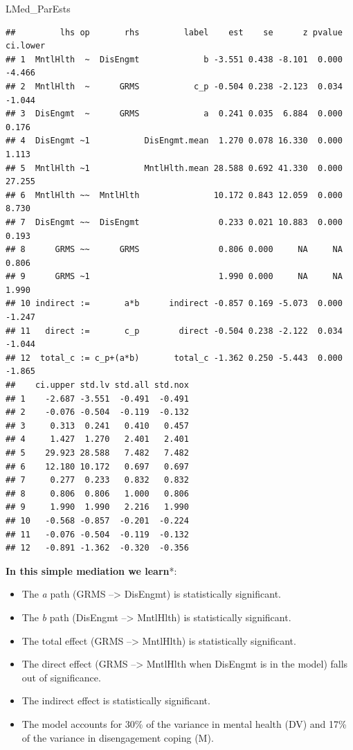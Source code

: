 \documentclass[
  11pt,
]{book}
\newenvironment{Shaded}{\begin{snugshade}}{\end{snugshade}}
\newcommand{\NormalTok}[1]{#1}
\providecommand{\tightlist}{%
  \setlength{\itemsep}{0pt}\setlength{\parskip}{0pt}}
\begin{document}
\begin{Shaded}
\begin{Highlighting}[]
\NormalTok{LMed\_ParEsts}
\end{Highlighting}
\end{Shaded}

\begin{verbatim}
##         lhs op       rhs         label    est    se      z pvalue ci.lower
## 1  MntlHlth  ~  DisEngmt             b -3.551 0.438 -8.101  0.000   -4.466
## 2  MntlHlth  ~      GRMS           c_p -0.504 0.238 -2.123  0.034   -1.044
## 3  DisEngmt  ~      GRMS             a  0.241 0.035  6.884  0.000    0.176
## 4  DisEngmt ~1           DisEngmt.mean  1.270 0.078 16.330  0.000    1.113
## 5  MntlHlth ~1           MntlHlth.mean 28.588 0.692 41.330  0.000   27.255
## 6  MntlHlth ~~  MntlHlth               10.172 0.843 12.059  0.000    8.730
## 7  DisEngmt ~~  DisEngmt                0.233 0.021 10.883  0.000    0.193
## 8      GRMS ~~      GRMS                0.806 0.000     NA     NA    0.806
## 9      GRMS ~1                          1.990 0.000     NA     NA    1.990
## 10 indirect :=       a*b      indirect -0.857 0.169 -5.073  0.000   -1.247
## 11   direct :=       c_p        direct -0.504 0.238 -2.122  0.034   -1.044
## 12  total_c := c_p+(a*b)       total_c -1.362 0.250 -5.443  0.000   -1.865
##    ci.upper std.lv std.all std.nox
## 1    -2.687 -3.551  -0.491  -0.491
## 2    -0.076 -0.504  -0.119  -0.132
## 3     0.313  0.241   0.410   0.457
## 4     1.427  1.270   2.401   2.401
## 5    29.923 28.588   7.482   7.482
## 6    12.180 10.172   0.697   0.697
## 7     0.277  0.233   0.832   0.832
## 8     0.806  0.806   1.000   0.806
## 9     1.990  1.990   2.216   1.990
## 10   -0.568 -0.857  -0.201  -0.224
## 11   -0.076 -0.504  -0.119  -0.132
## 12   -0.891 -1.362  -0.320  -0.356
\end{verbatim}

\textbf{In this simple mediation we learn}*:

\begin{itemize}
\tightlist
\item
  The \emph{a} path (GRMS --\textgreater{} DisEngmt) is statistically significant.
\item
  The \emph{b} path (DisEngmt --\textgreater{} MntlHlth) is statistically significant.
\item
  The total effect (GRMS --\textgreater{} MntlHlth) is statistically significant.
\item
  The direct effect (GRMS --\textgreater{} MntlHlth when DisEngmt is in the model) falls out of significance.
\item
  The indirect effect is statistically significant.
\item
  The model accounts for 30\% of the variance in mental health (DV) and 17\% of the variance in disengagement coping (M).
\end{itemize}
\end{document}
